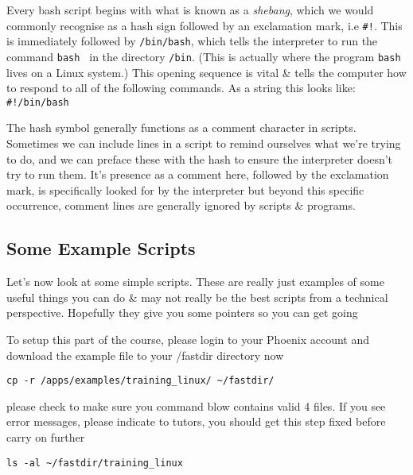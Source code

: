 \begin{information}
Every bash script begins with what is known as a \textit{shebang}, which we would commonly recognise
as a hash sign followed by an exclamation mark, i.e \texttt{\#!}.
This is immediately followed by \texttt{/bin/bash}, which tells the interpreter to run the command
\texttt{bash } in the directory \texttt{/bin}.
(This is actually where the program \texttt{bash} lives on a Linux system.)
This opening sequence is vital \& tells the computer how to respond to all of the following
commands.
As a string this looks like:\\

\texttt{\#!/bin/bash}\\
\end{information}

\begin{note}
The hash symbol generally functions as a comment character in scripts.
Sometimes we can include lines in a script to remind ourselves what we're trying to do, and we can
preface these with the hash to ensure the interpreter doesn't try to run them.
It's presence as a comment here, followed by the exclamation mark, is specifically looked for by the
interpreter but beyond this specific occurrence, comment lines are generally ignored by scripts \&
programs.
\end{note}

\subsection{Some Example Scripts}
Let's now look at some simple scripts.
These are really just examples of some useful things you can do \& may not really be the best
scripts from a technical perspective. Hopefully they give you some pointers so you can get going
\begin{warning}
To setup this part of the course, please login to your Phoenix account and download the example file to your /fastdir directory now
\begin{lstlisting}
cp -r /apps/examples/training_linux/ ~/fastdir/
\end{lstlisting}
please check to make sure you command blow contains valid 4 files. If you see error messages, please indicate to tutors, 
you should get this step fixed before carry on further
\begin{lstlisting}
ls -al ~/fastdir/training_linux
\end{lstlisting}
\end{warning}

